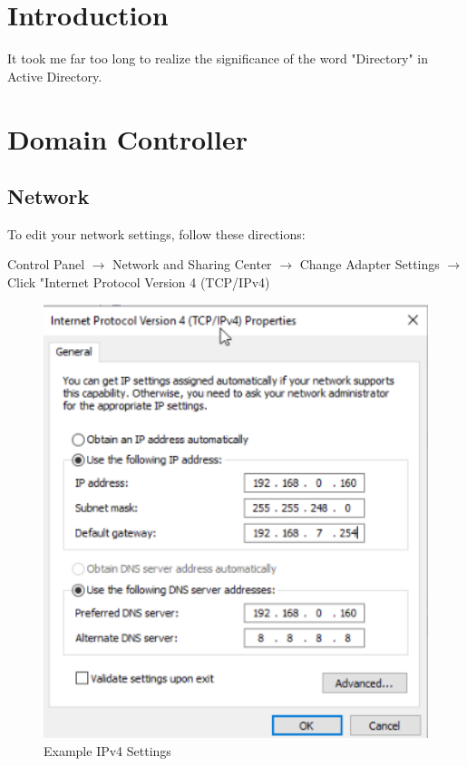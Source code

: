 \documentclass{article}
\begin{document}
\graphicspath{ {./Images/} }
\tableofcontents

\section{Introduction}
It took me far too long to realize the significance of the word "Directory" in Active Directory.

\section{Domain Controller}

\subsection{Network}
To edit your network settings, follow these directions:

Control Panel $\rightarrow$ Network and Sharing Center $\rightarrow$
Change Adapter Settings $\rightarrow$ Click "Internet Protocol Version 4 (TCP/IPv4)

\begin{figure}[]
        \centering
        \includegraphics[width=1\textwidth]{SampleDCIPv4.png}
        \caption{Example IPv4 Settings}
        \label{fig:IPv4Settings}
\end{figure}
\end{document}
